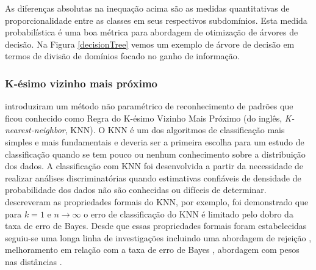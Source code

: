 As diferenças absolutas na inequação acima são as medidas quantitativas de
proporcionalidade entre as classes em seus respectivos subdomínios. Esta medida
probabilística é uma boa métrica para abordagem de otimização de árvores de
decisão. Na Figura \ref{decisionTree} vemos um exemplo de árvore de decisão em
termos de divisão de domínios focado no ganho de informação.

\subsubsection{K-ésimo vizinho mais próximo}

 introduziram um método não
paramétrico de reconhecimento de padrões que ficou conhecido como Regra do
K-ésimo Vizinho Mais Próximo (do inglês, \textit{K-nearest-neighbor}, KNN). O
KNN é um dos algoritmos de classificação mais simples e mais fundamentais e
deveria ser a primeira escolha para um estudo de classificação quando se tem
pouco ou nenhum conhecimento sobre a distribuição dos dados. A classificação com
KNN foi desenvolvida a partir da necessidade de realizar análises
discriminatórias quando estimativas confiáveis de densidade de probabilidade dos
dados não são conhecidas ou difíceis de determinar.
 descreveram as propriedades
formais do KNN, por exemplo, foi demonstrado que para \(k = 1\) e \(n \to
\infty\) o erro de classificação do KNN é limitado pelo dobro da taxa de erro de
Bayes. Desde que essas propriedades formais foram estabelecidas seguiu-se uma
longa linha de investigações incluindo uma abordagem de rejeição
, melhoramento em relação com a taxa
de erro de Bayes , abordagem com pesos nas
distâncias .


